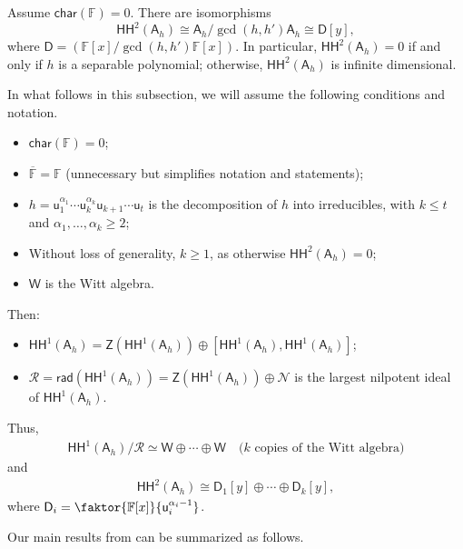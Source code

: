 \documentclass{commat}
\newcommand\q{\quad}
\newcommand{\FF}{\mathbb{F}}
\newcommand{\A}{\mathsf{A}}
\newcommand{\D}{\mathsf{D}}
\newcommand{\W}{\mathsf{W}}
\newcommand{\pr}{\mathsf{u}}
\newcommand\chara{\mathsf {char}}
\newcommand\hoch{\mathsf{HH}}
\begin{document}
\begin{theorem}
	Assume  $\chara(\FF)=0$. There are isomorphisms
	\begin{equation*}
		\hoch^2(\A_h) \cong \A_h/\gcd(h, h')\A_h\cong \D[y],
	\end{equation*}
	where $\D=\left(\FF[x]/\gcd(h, h')\FF[x]\right)$.
	In particular, $\hoch^2(\A_h)=0$ if and only if $h$ is a separable polynomial; otherwise, $\hoch^2(\A_h)$ is infinite dimensional. 
\end{theorem}

In what follows in this subsection, we will assume the following conditions and notation.
\begin{itemize}
	\item $\chara(\FF)=0$;
	\item $\overline{\FF}=\FF$ (unnecessary but simplifies notation and statements);
	\item $h=\pr_1^{\alpha_1}\cdots\pr_k^{\alpha_k}\pr_{k+1}\cdots \pr_t$ is the decomposition of $h$ into irreducibles, with $k\leq t$ and $\alpha_1, \ldots, \alpha_k\geq 2$;
	\item Without loss of generality, $k\geq 1$, as otherwise $\hoch^2(\A_h)=0$;
	\item  $\W$ is the Witt algebra.
\end{itemize}
Then:
\begin{itemize}
	\item $\hoch^1(\A_h) = \mathsf{Z}(\hoch^1(\A_h))  \oplus [\hoch^1(\A_h),\hoch^1(\A_h)]$;
	\item $\mathcal{R}=
	\mathsf{rad}(\hoch^1(\A_h))=
	\mathsf{Z}(\hoch^1(\A_h))\oplus \mathcal N$ is the largest nilpotent ideal of $\hoch^1(\A_h)$.
\end{itemize}
Thus,
\begin{align*}
	\hoch^1(\A_h)/\mathcal{R}\simeq{\W\oplus\cdots\oplus\W} \q \text{($k$ copies of the Witt algebra)}
\end{align*}
and 
\begin{align*}
	\hoch^2(\A_h)\cong \D_1[y]\oplus\cdots\oplus\D_k[y],
\end{align*}
where $\D_i=\faktor{\FF[x]}{\pr_i^{\alpha_i -1}}$.

Our main results from \cite[Sec.\ 6]{LS21} can be summarized as follows.
\end{document}
